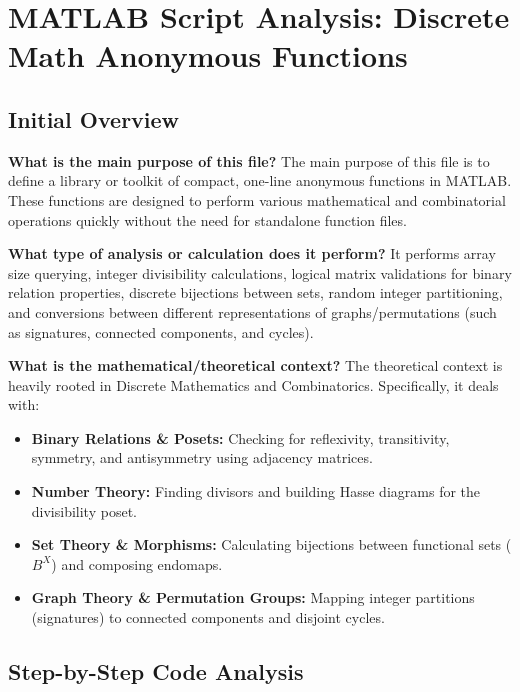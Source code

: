 
\chapter{MATLAB Script Analysis: Discrete Math Anonymous Functions}
\author{}
\date{}

\maketitle

\section{Initial Overview}

\textbf{What is the main purpose of this file?}
The main purpose of this file is to define a library or toolkit of compact, one-line anonymous functions in MATLAB. These functions are designed to perform various mathematical and combinatorial operations quickly without the need for standalone function files.

\textbf{What type of analysis or calculation does it perform?}
It performs array size querying, integer divisibility calculations, logical matrix validations for binary relation properties, discrete bijections between sets, random integer partitioning, and conversions between different representations of graphs/permutations (such as signatures, connected components, and cycles).

\textbf{What is the mathematical/theoretical context?}
The theoretical context is heavily rooted in Discrete Mathematics and Combinatorics. Specifically, it deals with:
\begin{itemize}
    \item \textbf{Binary Relations \& Posets:} Checking for reflexivity, transitivity, symmetry, and antisymmetry using adjacency matrices.
    \item \textbf{Number Theory:} Finding divisors and building Hasse diagrams for the divisibility poset.
    \item \textbf{Set Theory \& Morphisms:} Calculating bijections between functional sets ($B^X$) and composing endomaps.
    \item \textbf{Graph Theory \& Permutation Groups:} Mapping integer partitions (signatures) to connected components and disjoint cycles.
\end{itemize}

\section{Step-by-Step Code Analysis}

